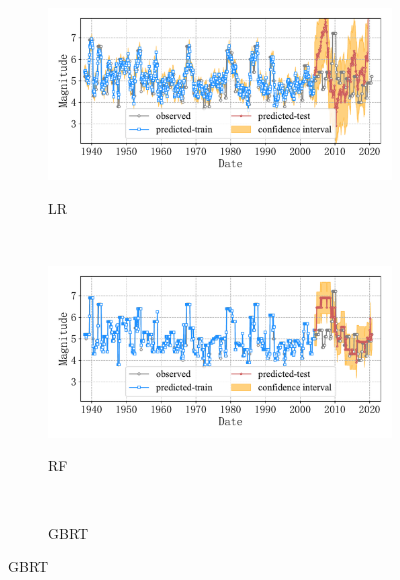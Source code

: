\begin{figure}[!htbp]
\begin{subfigure}[b]{0.45\textwidth}
    \caption{LR}
    \vspace{-0.2cm}
    \includegraphics[width=\textwidth]{Img/chap5_seism/block5/seism_lr_minyear_1932_maxyear_2021_spanlat_2_spanlon_4_timewindow_72_nextmonth_12_minmag_3.0_block_5.pdf}
    \vspace{-1cm}
    \label{fig:seism_lr_minyear_1932_maxyear_2021_spanlat_2_spanlon_4_timewindow_72_nextmonth_12_minmag_3.0_block_5}
  \end{subfigure}
  ~
  \begin{subfigure}[b]{0.45\textwidth}
    \caption{RF}
    \vspace{-0.2cm}
    \includegraphics[width=\textwidth]{Img/chap5_seism/block5/seism_rf_minyear_1932_maxyear_2021_spanlat_2_spanlon_4_timewindow_72_nextmonth_12_minmag_3.0_block_5.pdf}
    \vspace{-1cm}
    \label{fig:seism_rf_minyear_1932_maxyear_2021_spanlat_2_spanlon_4_timewindow_72_nextmonth_12_minmag_3.0_block_5}
  \end{subfigure}
  \\
  \begin{subfigure}[b]{0.45\textwidth}
    \caption{GBRT}
    \vspace{-0.2cm}

\end{subfigure}
\end{figure}

